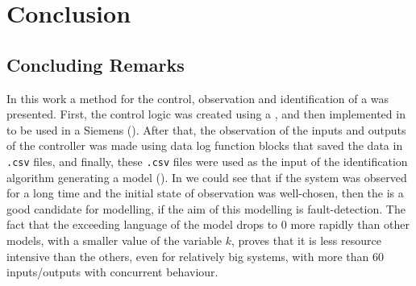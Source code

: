 \chapter{Conclusion}
\label{cha:conclusion}


\section{Concluding Remarks}
\label{sec:concludingRemarks}
In this work a method for the control, observation and identification of a
\DES{} was presented. First, the control logic was created using a \CIPN, and then implemented
in \LD{} to be used in a Siemens \PLC{} (). After that, the observation of the
inputs and outputs of the controller was made using data log function blocks that saved the data in
\verb|.csv| files, and finally, these \verb|.csv| files were used as the input of the
identification algorithm generating a \DAOCT{} model (). In
 we could see that if the system was observed for a long
time and the initial state of observation was well-chosen, then the \DAOCT{} is
a good candidate for modelling, if the aim of this modelling is fault-detection.
The fact that the exceeding language of the \DAOCT{} model drops to $0$ more
rapidly than other models, with a smaller value of the variable $k$, proves that it is less resource intensive than the
others, even for relatively big
systems, with more than $60$ inputs\slash outputs with concurrent behaviour.


